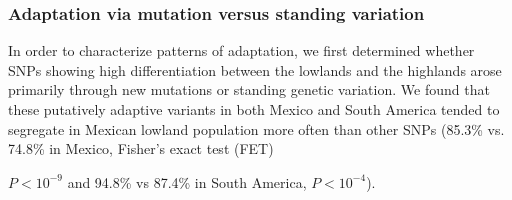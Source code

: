 \subsubsection{Adaptation via mutation versus standing variation}

In order to characterize patterns of adaptation, we first determined whether SNPs showing high differentiation between the lowlands and the highlands arose primarily through new mutations or standing genetic variation.  
We found that these putatively adaptive variants in both Mexico and South America tended to segregate in Mexican lowland population more often than other SNPs (85.3\% vs. 74.8\% in Mexico, Fisher's exact test (FET) {$P < 10^{-9}$ and 94.8\% vs 87.4\% in South America,  $P< 10^{-4}$).  


}
